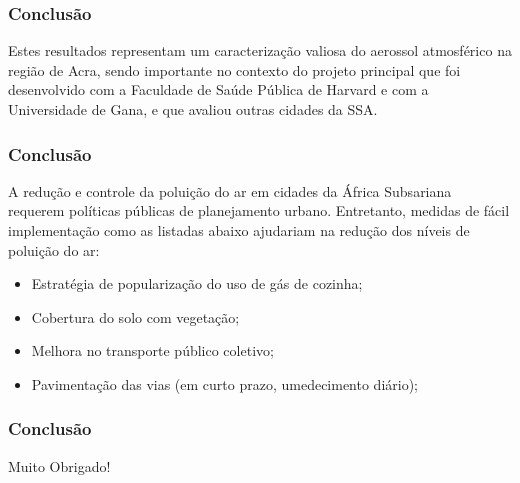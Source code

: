 \begin{frame}
  \frametitle{Conclusão}
   \begin{tcolorbox}[colback=blue!5,colframe=blue!40!black,title=Conclusão]
    Estes resultados representam um caracterização valiosa do aerossol atmosférico na região de Acra, sendo importante no contexto do projeto principal que foi desenvolvido com a Faculdade de Saúde Pública de Harvard e com a Universidade de Gana, e que avaliou outras cidades da SSA.
  \end{tcolorbox}
\end{frame}

\begin{frame}
  \frametitle{Conclusão}
  A redução e controle da poluição do ar em cidades da África Subsariana requerem políticas públicas de planejamento urbano. Entretanto, medidas de fácil implementação como as listadas abaixo ajudariam na redução dos níveis de poluição do ar:
  \begin{itemize}
    \item Estratégia de popularização do uso de gás de cozinha;
    \item Cobertura do solo com vegetação;
    \item Melhora no transporte público coletivo;
    \item Pavimentação das vias (em curto prazo, umedecimento diário);
  \end{itemize}
\end{frame}

\begin{frame}
  \frametitle{Conclusão}
  \begin{center}
    Muito Obrigado!
  \end{center}
\end{frame}

